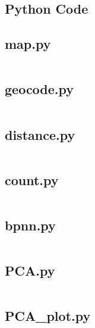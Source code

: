 \documentclass{mcmthesis}
\begin{document}
\begin{appendices}

\section{Python Code}

\subsection{map.py}\label{code:map}
\inputminted{python}{../src/map.py}

\subsection{geocode.py}\label{code:geocode}
\inputminted{python}{../src/geocode.py}

\subsection{distance.py}\label{code:distance}
\inputminted{python}{../src/distance.py}

\subsection{count.py} \label{code:count}
\inputminted{python}{../src/count.py}

\subsection{bpnn.py} \label{code:bpnn}
\inputminted{python}{../src/bpnn.py}

\subsection{PCA.py} \label{code:PCA}
\inputminted{python}{../src/PCA.py}

\subsection{PCA\_plot.py} \label{code:PCA_plot}
\inputminted{python}{../src/PCA_plot.py}



\end{appendices}
\end{document}
